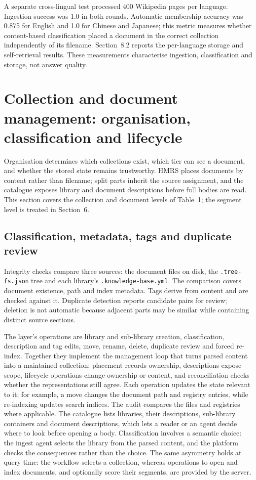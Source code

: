 \documentclass[11pt]{article}
\begin{document}
A separate cross-lingual test processed 400 Wikipedia pages per language.
Ingestion success was 1.0 in both rounds. Automatic membership accuracy was
0.875 for English and 1.0 for Chinese and Japanese; this metric measures
whether content-based classification placed a document in the correct
collection independently of its filename. Section~8.2 reports the
per-language storage and self-retrieval results. These measurements
characterise ingestion, classification and storage, not answer quality.


\section{Collection and document management: organisation, classification and
lifecycle}


Organisation determines which collections exist, which tier can see a
document, and whether the stored state remains trustworthy. HMRS places
documents by content rather than filename; split parts inherit the source
assignment, and the catalogue exposes library and document descriptions
before full bodies are read. This section covers the collection and document
levels of Table~1; the segment level is treated in
Section~6.

\subsection{Classification, metadata, tags and duplicate review}





Integrity checks compare three sources: the document files on disk, the
\texttt{.tree-fs.json} tree and each library's \texttt{.knowledge-base.yml}.
The comparison covers document existence, path and index metadata. Tags derive
from content and are checked against it.
Duplicate detection reports candidate pairs for review; deletion is not
automatic because adjacent parts may be similar while containing distinct
source sections.

The layer's operations are library and sub-library creation, classification,
description and tag edits, move, rename, delete, duplicate review and forced
re-index. Together they implement the management loop that turns parsed content
into a maintained collection: placement records ownership, descriptions expose
scope, lifecycle operations change ownership or content, and reconciliation
checks whether the representations still agree. Each operation updates the
state relevant to it; for example, a move changes the document path and
registry entries, while re-indexing updates search indices. The audit compares
the files and registries where applicable. The catalogue lists libraries, their
descriptions, sub-library containers and document descriptions, which lets a
reader or an agent decide where to look before opening a body. Classification
involves a semantic choice: the ingest agent
selects the library from the parsed content, and the platform checks the
consequences rather than the choice. The same asymmetry holds at query time: the workflow selects a collection,
whereas operations to open and index documents, and optionally score their
segments, are provided by the server.
\end{document}
